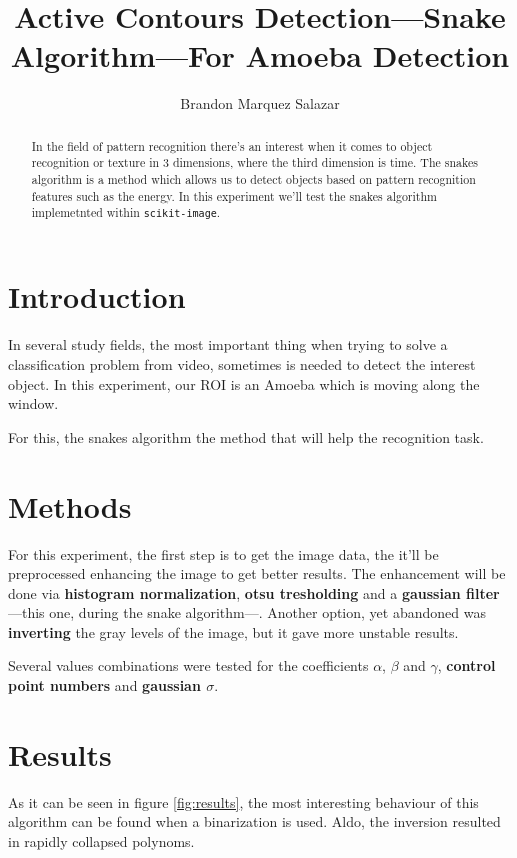 \documentclass[10pt]{IEEEtran}
\author{%
Brandon Marquez Salazar
}
\title{%
Active Contours Detection---Snake Algorithm---For Amoeba Detection
}
\begin{document}
  \maketitle
  \begin{abstract}
    In the field of pattern recognition there's an interest when it comes to
    object recognition or texture in 3 dimensions, where the third dimension is time.
    The snakes\cite{Kass1988} algorithm is a method which allows us to detect objects based on
    pattern recognition features such as the energy.
    In this experiment we'll test the snakes algorithm implemetnted within 
    \texttt{scikit-image}\cite{scikit-image-active-contours}.
  \end{abstract}

  \section{Introduction}

  In several study fields, the most important thing when trying to solve a classification problem
  from video, sometimes is needed to detect the interest object. In this experiment, our ROI is an
  Amoeba which is moving along the window.

  For this, the snakes algorithm\cite{Kass1988} the method that will help the recognition task.

  \section{Methods}

  For this experiment, the first step is to get the image data, the it'll be preprocessed
  enhancing the image to get better results.
  The enhancement will be done via \textbf{histogram normalization}, \textbf{otsu tresholding}
  and a \textbf{gaussian filter}---this one, during the snake algorithm---. Another option, yet
  abandoned was \textbf{inverting} the gray levels of the image, but it gave more unstable results.

  Several values combinations were tested for the coefficients \texttt{$\alpha$}, \texttt{$\beta$} and
  \texttt{$\gamma$}, \textbf{control point numbers} and \textbf{gaussian $\sigma$}.

  \section{Results}

  As it can be seen in figure \ref{fig:results}, the most interesting behaviour of this algorithm
  can be found when a binarization is used. Aldo, the inversion resulted in rapidly collapsed polynoms.
\end{document}
